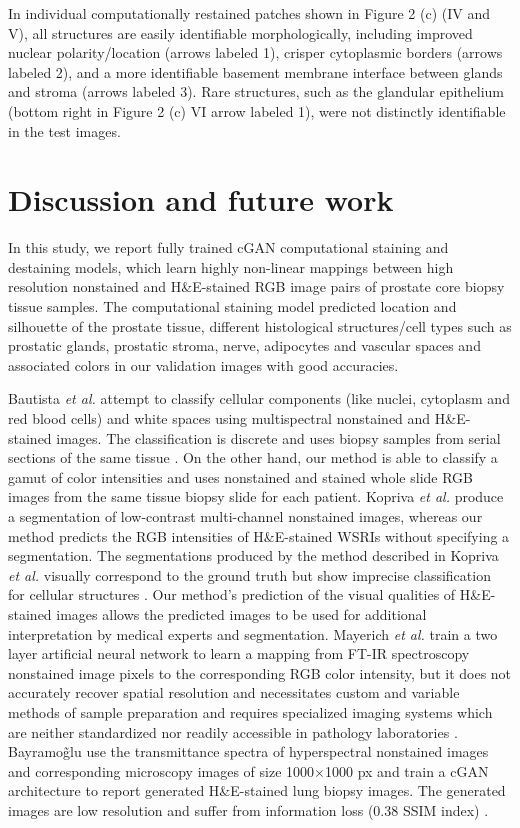 \documentclass[10pt, conference, compsocconf]{IEEEtran}
\begin{document}
In individual computationally restained patches shown in Figure 2 (c) (IV and V), all structures are easily identifiable morphologically, including improved nuclear polarity/location (arrows labeled 1), crisper cytoplasmic borders (arrows labeled 2), and a more identifiable basement membrane interface between glands and stroma (arrows labeled 3). Rare structures, such as the glandular epithelium (bottom right in Figure 2 (c) VI arrow labeled 1), were not distinctly identifiable in the test images.

\section{Discussion and future work}
In this study, we report fully trained cGAN computational staining and destaining models, which learn highly non-linear mappings between high resolution nonstained and H\&E-stained RGB image pairs of prostate core biopsy tissue samples. The computational staining model predicted location and silhouette of the prostate tissue, different histological structures/cell types such as prostatic glands, prostatic stroma, nerve, adipocytes and vascular spaces and associated colors in our validation images with good accuracies.

Bautista \textit{et al.} attempt to classify cellular components (like nuclei, cytoplasm and red blood cells) and white spaces using multispectral nonstained and H\&E-stained images. The classification is discrete and uses biopsy samples from serial sections of the same tissue \cite{bautista}. On the other hand, our method is able to classify a gamut of color intensities and uses nonstained and stained whole slide RGB images from the same tissue biopsy slide for each patient. Kopriva \textit{et al.} produce a segmentation of low-contrast multi-channel nonstained images, whereas our method predicts the RGB intensities of H\&E-stained WSRIs without specifying a segmentation. The segmentations produced by the method described in Kopriva \textit{et al.} visually correspond to the ground truth but show imprecise classification for cellular structures \cite{kopriva2015unsupervised}. Our method's prediction of the visual qualities of H\&E-stained images allows the predicted images to be used for additional interpretation by medical experts and segmentation. Mayerich \textit{et al.} train a two layer artificial neural network to learn a mapping from FT-IR spectroscopy nonstained image pixels to the corresponding RGB color intensity, but it does not accurately recover spatial resolution and necessitates custom and variable methods of sample preparation and requires specialized imaging systems which are neither standardized nor readily accessible in pathology laboratories \cite{mayerich2015stain}. Bayramo\~glu use the transmittance spectra of hyperspectral nonstained images and corresponding microscopy images of size 1000$\times$1000 px and train a cGAN architecture to report generated H\&E-stained lung biopsy images. The generated images are low resolution and suffer from information loss (0.38 SSIM index) \cite{bayramoglu}.
\end{document}
